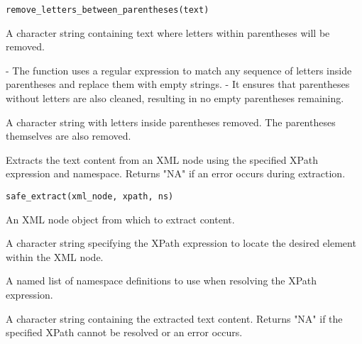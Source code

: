 \documentclass[a4paper]{book}
\begin{document}
%
\begin{Usage}
\begin{verbatim}
remove_letters_between_parentheses(text)
\end{verbatim}
\end{Usage}
%
\begin{Arguments}
\begin{ldescription}
\item[\code{text}] A character string containing text where letters within parentheses will be removed.
\end{ldescription}
\end{Arguments}
%
\begin{Details}
- The function uses a regular expression to match any sequence of letters inside parentheses and replace them with empty strings.
- It ensures that parentheses without letters are also cleaned, resulting in no empty parentheses remaining.
\end{Details}
%
\begin{Value}
A character string with letters inside parentheses removed. The parentheses themselves are also removed.
\end{Value}
%
\begin{Description}
Extracts the text content from an XML node using the specified XPath expression and namespace. Returns "NA" if an error occurs during extraction.
\end{Description}
%
\begin{Usage}
\begin{verbatim}
safe_extract(xml_node, xpath, ns)
\end{verbatim}
\end{Usage}
%
\begin{Arguments}
\begin{ldescription}
\item[\code{xml\_node}] An XML node object from which to extract content.

\item[\code{xpath}] A character string specifying the XPath expression to locate the desired element within the XML node.

\item[\code{ns}] A named list of namespace definitions to use when resolving the XPath expression.
\end{ldescription}
\end{Arguments}
%
\begin{Value}
A character string containing the extracted text content. Returns "NA" if the specified XPath cannot be resolved or an error occurs.
\end{Value}
\printindex{}
\end{document}
